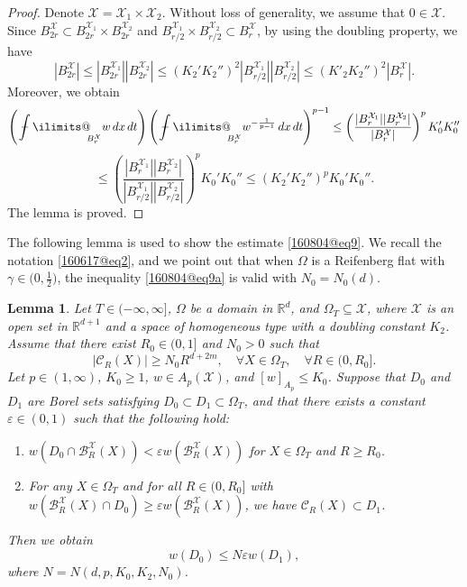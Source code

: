 \documentclass[reqno]{amsart}
\numberwithin{equation}{section}
\theoremstyle{plain}
\newtheorem{lemma}[theorem]{Lemma}
\theoremstyle{definition}
\theoremstyle{remark}
\begin{document}
\begin{proof}
Denote ${\mathcal{X}}={\mathcal{X}}_1\times {\mathcal{X}}_2$.
Without loss of generality, we assume that $0\in {\mathcal{X}}$.
Since $B_{2r}^{\mathcal{X}}\subset B^{{\mathcal{X}}_1}_{2r}\times B^{{\mathcal{X}}_2}_{2r}$ and $B^{{\mathcal{X}}_1}_{r/2}\times B^{{\mathcal{X}}_2}_{r/2}\subset B_r^{\mathcal{X}}$, by using the doubling property, we have 
$$
|B^{\mathcal{X}}_{2r}|\le |B^{{\mathcal{X}}_1}_{2r}||B^{{\mathcal{X}}_2}_{2r}|\le (K_2'K_2'')^2|B^{{\mathcal{X}}_1}_{r/2}||B^{{\mathcal{X}}_2}_{r/2}|\le (K'_2K_2'')^2|B_r^{\mathcal{X}}|.
$$
Moreover, we obtain
$$
\left({\operatorname{\,\,\text{\bf--}\kern-.98em\DOTSI\intop\ilimits@\!\!}}_{B_r^{\mathcal{X}}}w\,dx\,dt\right)\left({\operatorname{\,\,\text{\bf--}\kern-.98em\DOTSI\intop\ilimits@\!\!}}_{B_r^{\mathcal{X}}}w^{-\frac{1}{p-1}}\,dx\,dt\right)^{p-1}\le \left(\frac{|B_r^{{\mathcal{X}}_1}||B_{r}^{{\mathcal{X}}_2}|}{|B_r^{\mathcal{X}}|}\right)^pK_0'K_0''
$$
$$
\le \left(\frac{|B_r^{{\mathcal{X}}_1}||B_{r}^{{\mathcal{X}}_2}|}{|B_{r/2}^{{\mathcal{X}}_1}||B^{{\mathcal{X}}_2}_{r/2}|}\right)^pK_0'K_0''\le (K_2'K_2'')^pK_0'K_0''.
$$
The lemma is proved.
\end{proof}

The following lemma is used to show the estimate \eqref{160804@eq9}.
We recall the notation \eqref{160617@eq2}, and we  point out that when $\Omega$ is a Reifenberg flat with $\gamma\in \big(0,\frac{1}{2}\big)$, the inequality  \eqref{160804@eq9a} is valid with $N_0=N_0(d)$. 

\begin{lemma}		\label{160804@LEM1}
Let $T\in (-\infty,\infty]$, $\Omega$ be a domain in ${\mathbb{R}}^d$,  and $\Omega_T\subseteq{\mathcal{X}}$, where  ${\mathcal{X}}$ is an open set in ${\mathbb{R}}^{d+1}$ and a space of homogeneous type with a doubling constant $K_2$.
Assume that there exist $R_0\in (0,1]$ and $N_0>0$ such that 
\begin{equation}		\label{160804@eq9a}
|{\mathcal{C}}_R(X)|\ge N_0R^{d+2m}, \quad \forall X\in \Omega_T, \quad \forall R\in (0,R_0].
\end{equation}
Let $p\in (1,\infty)$, $K_0\ge 1$, $w\in A_p({\mathcal{X}})$, and $[w]_{A_p}\le K_0$.
Suppose that  $D_0$ and $D_1$ are Borel sets satisfying $D_0\subset D_1\subset \Omega_T$, and that there exists a constant $\varepsilon\in (0,1)$ such that the following hold:
\begin{enumerate}[$(i)$]
\item
$w(D_0\cap {\mathcal{B}}_{R}^{\mathcal{X}}(X))<\varepsilon w({\mathcal{B}}^{\mathcal{X}}_{R}(X))$ for $X\in \Omega_T$ and $R\ge R_0$.
\item
For any $X\in \Omega_T$ and for all $R\in (0, R_0]$ with $w({\mathcal{B}}^{\mathcal{X}}_R(X)\cap D_0)\ge \varepsilon w({\mathcal{B}}_R^{\mathcal{X}}(X))$, we have ${\mathcal{C}}_R(X)\subset D_1$.
\end{enumerate}
Then we obtain 
\[
w(D_0)\le N\varepsilon w(D_1),
\]
where $N=N(d,p, K_0,K_2,N_0)$.

\end{lemma}
\end{document}
